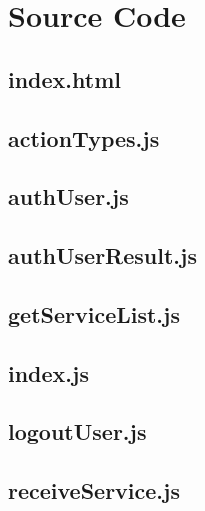 \documentclass[a4paper,landscape]{report}
\begin{document}
\tableofcontents


\chapter{Source Code}

\newpage
\section{index.html}


\newpage
\section{actionTypes.js}


\newpage
\section{authUser.js}


\newpage
\section{authUserResult.js}


\newpage
\section{getServiceList.js}


\newpage
\section{index.js}


\newpage
\section{logoutUser.js}


\newpage
\section{receiveService.js}

\end{document}
